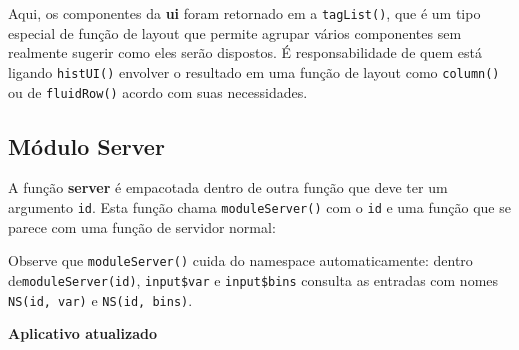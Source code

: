 \documentclass[
]{book}
\newenvironment{Shaded}{\begin{snugshade}}{\end{snugshade}}
\newcommand{\AttributeTok}[1]{\textcolor[rgb]{0.77,0.63,0.00}{#1}}
\newcommand{\ControlFlowTok}[1]{\textcolor[rgb]{0.13,0.29,0.53}{\textbf{#1}}}
\newcommand{\DecValTok}[1]{\textcolor[rgb]{0.00,0.00,0.81}{#1}}
\newcommand{\FunctionTok}[1]{\textcolor[rgb]{0.00,0.00,0.00}{#1}}
\newcommand{\NormalTok}[1]{#1}
\newcommand{\OtherTok}[1]{\textcolor[rgb]{0.56,0.35,0.01}{#1}}
\newcommand{\SpecialCharTok}[1]{\textcolor[rgb]{0.00,0.00,0.00}{#1}}
\begin{document}
Aqui, os componentes da \textbf{ui} foram retornado em a \texttt{tagList()}, que é um tipo especial de função de layout que permite agrupar vários componentes sem realmente sugerir como eles serão dispostos. É responsabilidade de quem está ligando \texttt{histUI()} envolver o resultado em uma função de layout como \texttt{column()} ou de \texttt{fluidRow()} acordo com suas necessidades.

\hypertarget{muxf3dulo-server}{%
\subsection{\texorpdfstring{\textbf{Módulo Server}}{Módulo Server}}\label{muxf3dulo-server}}

A função \textbf{server} é empacotada dentro de outra função que deve ter um argumento \texttt{id}. Esta função chama \texttt{moduleServer()} com o \texttt{id} e uma função que se parece com uma função de servidor normal:

\begin{Shaded}
\end{Shaded}

Observe que \texttt{moduleServer()} cuida do namespace automaticamente: dentro de\texttt{moduleServer(id)}, \texttt{input\$var} e \texttt{input\$bins} consulta as entradas com nomes \texttt{NS(id,\ \textquotesingle{}var\textquotesingle{})} e \texttt{NS(id,\ \textquotesingle{}bins\textquotesingle{})}.

\textbf{Aplicativo atualizado}
\end{document}
